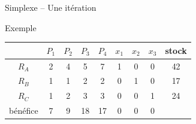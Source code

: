 \documentclass{beamer}
\begin{document}
  \begin{frame}{Simplexe -- Une itération}
    \begin{exampleblock}{Exemple}
      \begin{center}
        \begin{tabular}{|c|ccccccc|c|}\hline
          & $P_1$ & $P_2$ & $P_3$ & $P_4$ & $x_1$ & $x_2$ & $x_3$ & stock \\ \hline
          $R_A$ & 2 & 4 & 5 & 7 & 1 & 0 & 0 & 42 \\
          $R_B$ & 1 & 1 & 2 & 2 & 0 & 1 & 0 & 17 \\
          $R_C$ & 1 & 2 & 3 & 3 & 0 & 0 & 1 & 24 \\ \hline
          bénéfice & 7 & 9 & \color{red}18\color{black} & 17 & 0 & 0 & 0 & \\ \hline
        \end{tabular}
      \end{center}
    \end{exampleblock}
  \end{frame}
\end{document}

